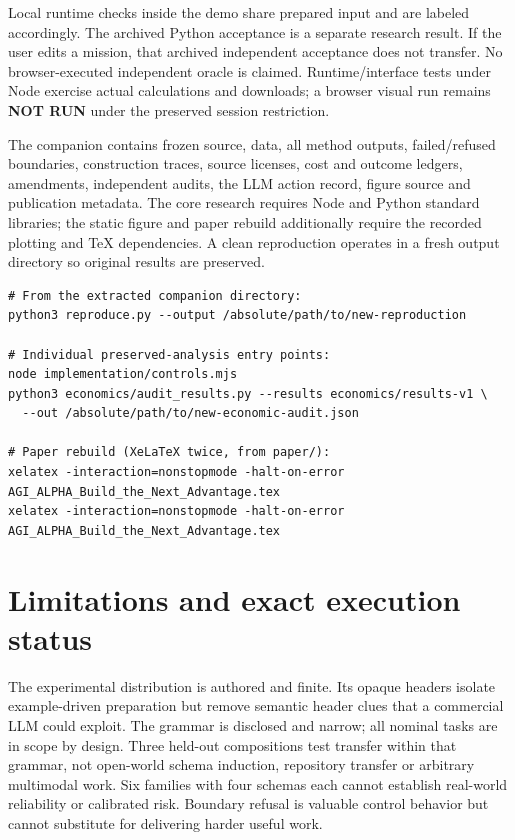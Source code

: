 \documentclass[11pt,letterpaper]{article}
\newcommand{\status}[1]{{\sffamily\bfseries\small #1}}
\begin{document}
Local runtime checks inside the demo share prepared input and are labeled accordingly. The archived Python acceptance is a separate research result. If the user edits a mission, that archived independent acceptance does not transfer. No browser-executed independent oracle is claimed. Runtime/interface tests under Node exercise actual calculations and downloads; a browser visual run remains \status{NOT RUN} under the preserved session restriction.

The companion contains frozen source, data, all method outputs, failed/refused boundaries, construction traces, source licenses, cost and outcome ledgers, amendments, independent audits, the LLM action record, figure source and publication metadata. The core research requires Node and Python standard libraries; the static figure and paper rebuild additionally require the recorded plotting and TeX dependencies. A clean reproduction operates in a fresh output directory so original results are preserved.

\begin{minipage}{\linewidth}
\begin{lstlisting}
# From the extracted companion directory:
python3 reproduce.py --output /absolute/path/to/new-reproduction

# Individual preserved-analysis entry points:
node implementation/controls.mjs
python3 economics/audit_results.py --results economics/results-v1 \
  --out /absolute/path/to/new-economic-audit.json

# Paper rebuild (XeLaTeX twice, from paper/):
xelatex -interaction=nonstopmode -halt-on-error AGI_ALPHA_Build_the_Next_Advantage.tex
xelatex -interaction=nonstopmode -halt-on-error AGI_ALPHA_Build_the_Next_Advantage.tex
\end{lstlisting}
\end{minipage}

\section{Limitations and exact execution status}

The experimental distribution is authored and finite. Its opaque headers isolate example-driven preparation but remove semantic header clues that a commercial LLM could exploit. The grammar is disclosed and narrow; all nominal tasks are in scope by design. Three held-out compositions test transfer within that grammar, not open-world schema induction, repository transfer or arbitrary multimodal work. Six families with four schemas each cannot establish real-world reliability or calibrated risk. Boundary refusal is valuable control behavior but cannot substitute for delivering harder useful work.
\end{document}
